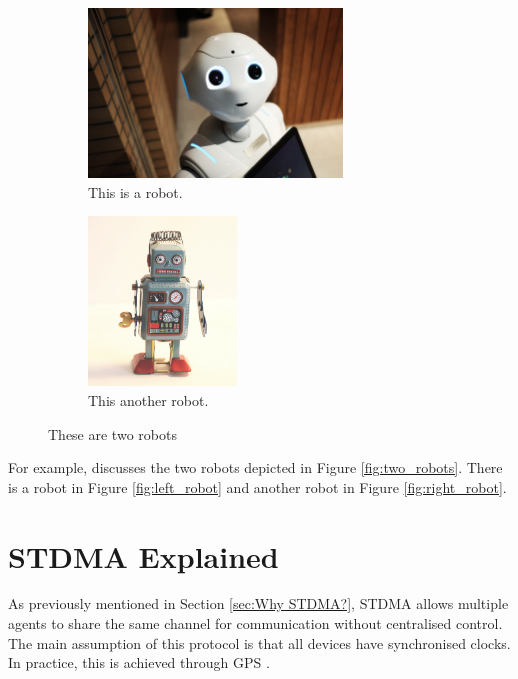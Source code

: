 {\begin{figure}[htb]
\centering
\begin{subfigure}[t]{.5\textwidth}
  \centering
  \includegraphics[height=4.5cm]{figures/Robot_1.jpg}
  \caption{\label{fig:left_robot} This is a robot.}
  \label{fig:theoretical}
\end{subfigure}%
\begin{subfigure}[t]{.5\textwidth}
  \centering
  \includegraphics[height=4.5cm]{figures/Robot_2.jpg}
  \caption{\label{fig:right_robot} This another robot.}
  \label{fig:practical}
\end{subfigure}
\caption{\label{fig:two_robots} These are two robots}
\label{fig:test}
\end{figure}

For example, \cite{Robots2020} discusses the two robots depicted in Figure \ref{fig:two_robots}. There is a robot in Figure \ref{fig:left_robot} and another robot in Figure \ref{fig:right_robot}.

}


\section{STDMA Explained}
\label{sec:STDMA Explained}

As previously mentioned in Section \ref{sec:Why STDMA?}, STDMA \cite{STDMA} allows multiple agents to 
share the same channel for communication without centralised control. The main assumption of this protocol
is that all devices have synchronised clocks. In practice, this is achieved through GPS \cite{STDMA_2}.

